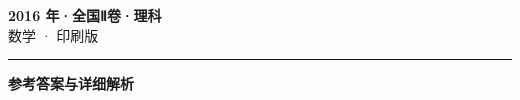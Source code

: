 \documentclass[zihao=5, a4paper]{ctexart}
\begin{document}
\begin{center}
  {\Large\bfseries 2016 年·全国Ⅱ卷·理科}\\[4pt]
  {\large 数学 · 印刷版}
\end{center}
\medskip
{}

\par\bigskip\hrule\bigskip
{}
\begin{center}{\large\bfseries 参考答案与详细解析}\end{center}
\smallskip

\end{document}
